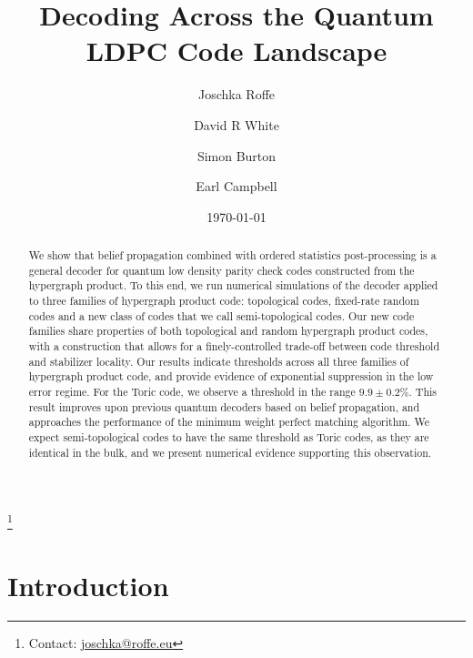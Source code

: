 \documentclass[%
 reprint,
superscriptaddress,
nofootinbib,
 amsmath,amssymb,
secnumarabic
]{revtex4-1}
\newcommand*{\etc}[1]{{#1}}
\begin{document}
\title{Decoding Across the Quantum LDPC Code Landscape}


\author{Joschka Roffe}
\thanks{Contact: \href{mailto:joschka@roffe.eu}{joschka@roffe.eu}}
\author{David R White}
\author{Simon Burton}
\author{Earl Campbell}
\date{\today}

      




\begin{abstract}
We show that belief propagation combined with ordered statistics post-processing is a general decoder for quantum low density parity check codes constructed from the hypergraph product. To this end, we run numerical simulations of the decoder applied to three families of hypergraph product code: topological codes, fixed-rate random codes and a new class of codes that we call semi-topological codes.  Our new code families share properties of both topological and random hypergraph product codes, with a construction that allows for a finely-controlled trade-off between code threshold and stabilizer locality. Our results indicate thresholds across all three families of hypergraph product code, and provide evidence of exponential suppression in the low error regime. For the Toric code, we observe a threshold in the range $9.9\pm0.2\%$. This result improves upon previous quantum decoders based on belief propagation, and approaches the performance of the minimum weight perfect matching algorithm.  We expect \etc{semi-topological codes to have the same threshold as Toric codes, as they are identical in the bulk, and we present numerical evidence supporting this observation.}


\end{abstract}

\maketitle
\newpage


\section{Introduction}
\end{document}
